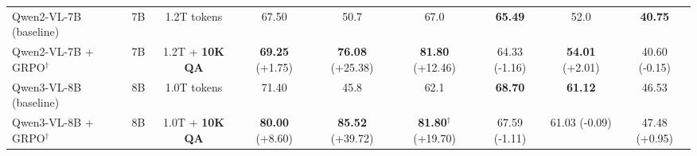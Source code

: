 {\begin{table}[t]
{\begin{tabular}{l c c c c c c c c}
\midrule
Qwen2-VL-7B (baseline)        & 7B & 1.2T tokens          & 67.50  & 50.7  & 67.0  & \textbf{65.49}  &  52.0  & \textbf{40.75}   \\
Qwen2-VL-7B + GRPO$^\dagger$  & 7B & \cellcolor{blue!8}1.2T + \textbf{10K QA} & \textbf{69.25} \textcolor{green!70!black}{\small(+1.75)} & \textbf{76.08} \textcolor{green!70!black}{\small(+25.38)} & \textbf{81.80} \textcolor{green!70!black}{\small(+12.46)} & 64.33 \textcolor{red!70!black}{\small(-1.16)} & \textbf{54.01} \textcolor{green!70!black}{\small(+2.01)} & 40.60 \textcolor{red!70!black}{\small(-0.15)}\\
\midrule
Qwen3-VL-8B (baseline)        & 8B & 1.0T tokens          & 71.40  & 45.8  & 62.1  & \textbf{68.70} & \textbf{61.12} & 46.53   \\
\rowcolor{yellow!10}
Qwen3-VL-8B + GRPO$^\dagger$  & 8B & \cellcolor{blue!8}1.0T + \textbf{10K QA} & \textbf{80.00} \textcolor{green!70!black}{\small(+8.60)} & \textbf{85.52} \textcolor{green!70!black}{\small(+39.72)} & \textbf{81.80}$^\dagger$ \textcolor{green!70!black}{\small(+19.70)} & 67.59 \textcolor{red!70!black}{\small(-1.11)}   & 61.03 \textcolor{red!70!black}{\small(-0.09)} & 47.48 \textcolor{green!70!black}{\small(+0.95)} \\
\bottomrule
\end{tabular}}%
\end{table}
}



